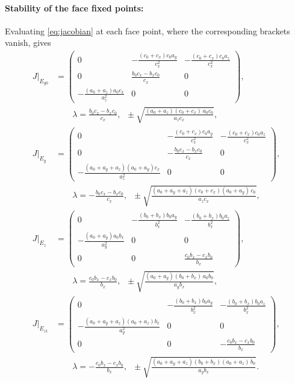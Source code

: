 \documentclass[10pt]{article}
\begin{document}
\begin{appendices}
\paragraph{Stability of the face fixed points:} Evaluating \cref{eq:jacobian} at each face point, where the corresponding brackets vanish, gives
\begin{align*}
J\big|_{E_{y0}} &=
\begin{pmatrix}
0 & -\frac{(c_0+c_x)c_0 a_y}{c_x^2} & -\frac{(c_0+c_x)c_0 a_z}{c_x^2} \\
0 & \frac{b_0c_x - b_x c_0}{c_x} & 0 \\
-\frac{(a_0+a_z)a_0 c_x}{a_z^2} & 0 & 0
\end{pmatrix},\\
&\qquad \lambda = \frac{b_0c_x - b_x c_0}{c_x},\;\; \pm\sqrt{\frac{(a_0+a_z)(c_0+c_x)\,a_0 c_0}{a_z c_x}},\\[6pt]
J\big|_{E_{y}} &=
\begin{pmatrix}
0 & -\frac{(c_0+c_x)c_0 a_y}{c_x^2} & -\frac{(c_0+c_x)c_0 a_z}{c_x^2} \\
0 & -\frac{b_0c_x - b_x c_0}{c_x} & 0 \\
-\frac{(a_0+a_y+a_z)(a_0+a_y) c_x}{a_z^2} & 0 & 0
\end{pmatrix},\\
&\qquad \lambda = -\frac{b_0c_x - b_x c_0}{c_x},\;\; \pm\sqrt{\frac{(a_0+a_y+a_z)(c_0+c_x)(a_0+a_y)\,c_0}{a_z c_x}},\\[6pt]
J\big|_{E_{z}} &=
\begin{pmatrix}
0 & -\frac{(b_0+b_x)b_0 a_y}{b_x^2} & -\frac{(b_0+b_x)b_0 a_z}{b_x^2} \\
-\frac{(a_0+a_y)a_0 b_x}{a_y^2} & 0 & 0 \\
0 & 0 & \frac{c_0b_x - c_x b_0}{b_x}
\end{pmatrix},\\
&\qquad \lambda = \frac{c_0b_x - c_x b_0}{b_x},\;\; \pm\sqrt{\frac{(a_0+a_y)(b_0+b_x)\,a_0 b_0}{a_y b_x}},\\[6pt]
J\big|_{E_{z1}} &=
\begin{pmatrix}
0 & -\frac{(b_0+b_x)b_0 a_y}{b_x^2} & -\frac{(b_0+b_x)b_0 a_z}{b_x^2} \\
-\frac{(a_0+a_y+a_z)(a_0+a_z) b_x}{a_y^2} & 0 & 0 \\
0 & 0 & -\frac{c_0b_x - c_x b_0}{b_x}
\end{pmatrix},\\
&\qquad \lambda = -\frac{c_0b_x - c_x b_0}{b_x},\;\; \pm\sqrt{\frac{(a_0+a_y+a_z)(b_0+b_x)(a_0+a_z)\,b_0}{a_y b_x}}.
\end{align*}

\end{appendices}
\end{document}
